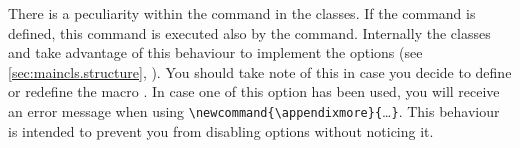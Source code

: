 \begin{Declaration}
\end{Declaration}%
%
There is a peculiarity within the  command in the
{\KOMAScript} classes. If the command  is defined, this
command is executed also by the  command. Internally the
{\KOMAScript} classes  and  take advantage of this behaviour to
implement the options  (see
\autoref{sec:maincls.structure},
). You
should take note of this in case you decide to define or redefine the macro
. In case one of this option has been used, you will
receive an error message when using
\verb|\newcommand{\appendixmore}{|\dots\verb|}|. This behaviour is intended to
prevent you from disabling options without noticing it.

